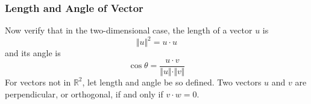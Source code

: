 \documentclass[xcolor=dvipsnames]{beamer}
\begin{document}
\begin{frame}
  \frametitle{Length and Angle of Vector}
  Now verify that in the two-dimensional case, the length of a vector $u$
  is
  \begin{equation}
    \label{eq:zuabiemu}
    \Vert{}u\Vert^{2}=u\cdot{}u
  \end{equation}
  and its angle is
  \begin{equation}
    \label{eq:iechaigu}
    \cos\theta=\frac{u\cdot{}v}{\Vert{}u\Vert\cdot\Vert{}v\Vert}
  \end{equation}
  For vectors not in $\mathbb{R}^{2}$, let length and angle be so
  defined. Two vectors $u$ and $v$ are \alert{perpendicular}, or
  \alert{orthogonal}, if and only if $v\cdot{}w=0$.
\end{frame}


\end{document}
